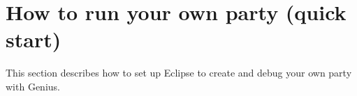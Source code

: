 \documentclass[]{llncs}
\newcommand\Genius{{\sc Genius}}
\begin{document}
%
%
%
%


\section{How to run your own party (quick start)}\label{sec:run own Agent}
This section describes how to set up Eclipse to create and debug your own party with {\Genius}.
\end{document}
